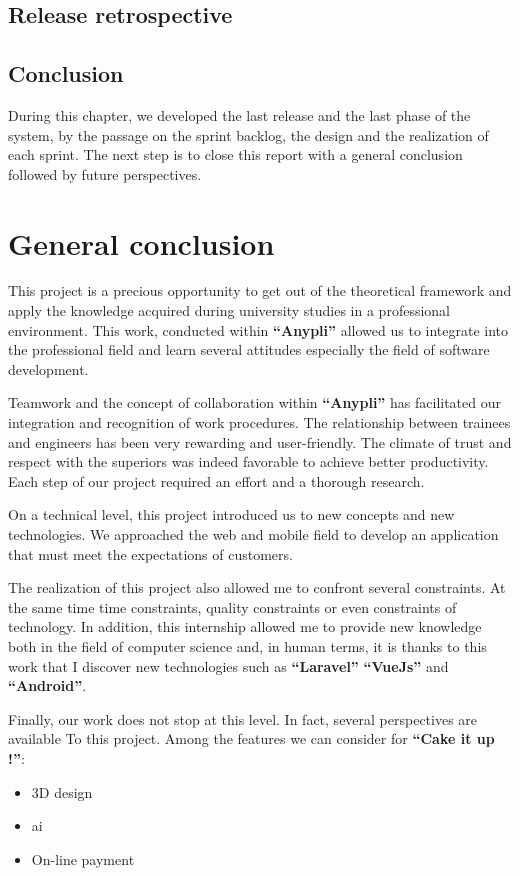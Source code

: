 \documentclass[12pt,a4paper]{report}
\begin{document}
	\section{Release retrospective}
	
	\section*{Conclusion}
	During this chapter, we developed the last release and the last phase of the system, by the passage on the sprint backlog, the design and the realization of each sprint. The next step is to close this report with a general conclusion followed by future perspectives.
	\chapter*{\centering General conclusion}
	This project is a precious opportunity to get out of the theoretical framework and apply the knowledge acquired during university studies in a professional environment. This work, conducted within \textbf{``Anypli''} allowed us to integrate into the professional field and learn several attitudes especially the field of software development.\par 
	Teamwork and the concept of collaboration within  \textbf{``Anypli''} has facilitated our integration and recognition of work procedures. The relationship between trainees and engineers has been very rewarding and user-friendly. The climate of trust and respect with the superiors was indeed favorable to achieve better productivity. Each step of our project required an effort and a thorough research.\par 
	On a technical level, this project introduced us to new concepts and new technologies. We approached the web and mobile field to develop an application that must meet the expectations of customers.\par 
	The realization of this project also allowed me to confront several constraints. At the same time time constraints, quality constraints or even constraints of technology. In addition, this internship allowed me to provide new knowledge both in the field of computer science and, in human terms, it is thanks to this work that I discover new technologies such as \textbf{``Laravel''} \textbf{``VueJs''} and \textbf{``Android''}.\par 
	Finally, our work does not stop at this level. In fact, several perspectives are available
	To this project.
	Among the features we can consider for \textbf{``Cake it up !''}:
	\begin{itemize}
		\item 3D design 
		\item \ac{ai}
		\item On-line payment
		
	\end{itemize}
	
	
	\clearpage
	
	
	
	
	
	
	
	
	
	
\end{document}
